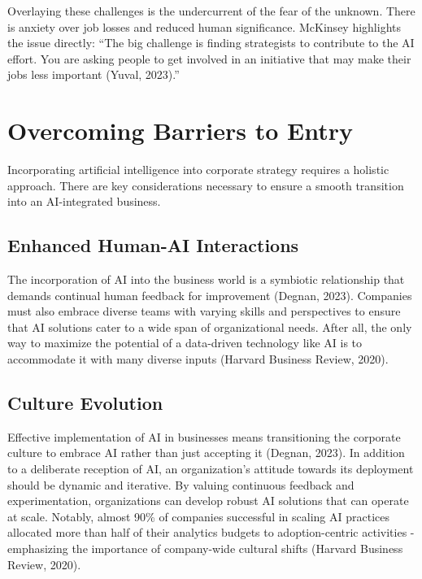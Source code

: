 \documentclass[
]{book}
\begin{document}
Overlaying these challenges is the undercurrent of the fear of the unknown. There is anxiety over job losses and reduced human significance. McKinsey highlights the issue directly: ``The big challenge is finding strategists to contribute to the AI effort. You are asking people to get involved in an initiative that may make their jobs less important (Yuval, 2023).''

\hypertarget{overcoming-barriers-to-entry}{%
\section{Overcoming Barriers to Entry}\label{overcoming-barriers-to-entry}}

Incorporating artificial intelligence into corporate strategy requires a holistic approach. There are key considerations necessary to ensure a smooth transition into an AI-integrated business.

\hypertarget{enhanced-human-ai-interactions}{%
\subsection{Enhanced Human-AI Interactions}\label{enhanced-human-ai-interactions}}

The incorporation of AI into the business world is a symbiotic relationship that demands continual human feedback for improvement (Degnan, 2023). Companies must also embrace diverse teams with varying skills and perspectives to ensure that AI solutions cater to a wide span of organizational needs. After all, the only way to maximize the potential of a data-driven technology like AI is to accommodate it with many diverse inputs (Harvard Business Review, 2020).

\hypertarget{culture-evolution}{%
\subsection{Culture Evolution}\label{culture-evolution}}

Effective implementation of AI in businesses means transitioning the corporate culture to embrace AI rather than just accepting it (Degnan, 2023). In addition to a deliberate reception of AI, an organization's attitude towards its deployment should be dynamic and iterative. By valuing continuous feedback and experimentation, organizations can develop robust AI solutions that can operate at scale. Notably, almost 90\% of companies successful in scaling AI practices allocated more than half of their analytics budgets to adoption-centric activities - emphasizing the importance of company-wide cultural shifts (Harvard Business Review, 2020).
\end{document}
